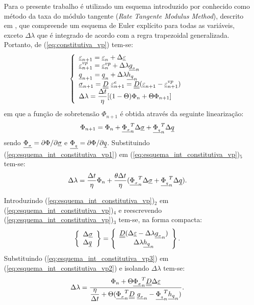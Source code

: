 Para o presente trabalho é utilizado um esquema introduzido por  conhecido como método da taxa do módulo tangente (\textit{Rate Tangente Modulus Method}), descrito em , que compreende um esquema de Euler explícito para todas as variáveis, exceto $\Delta \lambda$ que é integrado de acordo com a regra trapezoidal generalizada. Portanto, de (\ref{eq:constitutiva_vp}) tem-se:
\begin{equation}
	\label{eq:esquema_int_constitutiva_vp}
	\left\{
	\begin{array}{lcl}
		\underline{\varepsilon}_{n+1} = \underline{\varepsilon}_n + \Delta \underline{\varepsilon} \\
		\underline{\varepsilon}_{n+1}^{vp} = \underline{\varepsilon}_n^{vp} + \Delta \lambda \underline{g_{_\sigma}}_n \\
		\underline q_{n+1} = \underline q_n + \Delta \lambda \underline{h_q}_n \\	
		\underline \sigma_{n+1} = \underline{\underline D}~\underline{\varepsilon}_{n+1}^e = \underline{\underline D}(\underline{\varepsilon}_{n+1} - \underline{\varepsilon}_{n+1}^{vp}) \\
		\Delta \lambda = \dfrac{\Delta t}{\eta}[(1-\Theta)\Phi_n + \Theta \Phi_{n+1}]
	\end{array}
	\right.
\end{equation}
em que a função de sobretensão $\Phi_{n+1}$ é obtida através da seguinte linearização:
\begin{equation}
	\label{eq:esquema_int_constitutiva_vp1}
	\Phi_{n+1} = \Phi_n + \underline{\Phi_{_\sigma}}_n^T \Delta \underline \sigma + \underline{\Phi_{_q}}_n^T \Delta \underline q
\end{equation}
sendo $\underline{\Phi_{_\sigma}} = \partial \Phi / \partial \underline \sigma$ e $\underline{\Phi_{_q}} = \partial \Phi / \partial \underline q$. Substituindo (\ref{eq:esquema_int_constitutiva_vp1}) em (\ref{eq:esquema_int_constitutiva_vp})$_5$ tem-se:
\begin{equation}
	\label{eq:esquema_int_constitutiva_vp2}
	\Delta \lambda = \dfrac{\Delta t}{\eta} \Phi_n + \dfrac{\theta \Delta t}{\eta}(\underline{\Phi_{_\sigma}}_n^T \Delta \underline \sigma + \underline{\Phi_{_q}}_n^T \Delta \underline q).
\end{equation}

Introduzindo (\ref{eq:esquema_int_constitutiva_vp})$_2$ em (\ref{eq:esquema_int_constitutiva_vp})$_4$ e reescrevendo (\ref{eq:esquema_int_constitutiva_vp})$_3$ tem-se, na forma compacta:
\begin{equation}
	\label{eq:esquema_int_constitutiva_vp3}
	\left\{ \begin{array}{lcl} \Delta \underline \sigma \\ \Delta \underline q \end{array} \right\} = \left\{ \begin{array}{ccc} \underline{\underline D}(\Delta\underline{\varepsilon} -\Delta \lambda \underline{g_{_\sigma}}_n) \\ \Delta \lambda \underline{h_q}_n \end{array} \right\}.
\end{equation}
Substituindo (\ref{eq:esquema_int_constitutiva_vp3}) em (\ref{eq:esquema_int_constitutiva_vp2}) e isolando $\Delta \lambda$ tem-se:
\begin{equation}
	\label{eq:esquema_int_constitutiva_vp4}
	\Delta \lambda = \dfrac{\Phi_n + \Theta \underline{\Phi_{_\sigma}}_n^T\underline{\underline D}\Delta\underline{\varepsilon}}{\dfrac{\eta}{\Delta t} + \Theta (\underline{\Phi_{_\sigma}}_n^T\underline{\underline D}~\underline{g_{_\sigma}}_n - \underline{\Phi_{_q}}_n^T \underline{h_q}_n)}.
\end{equation}

